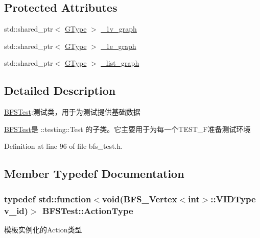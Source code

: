 \subsection*{Protected Attributes}
\begin{DoxyCompactItemize}
\item 
std\+::shared\+\_\+ptr$<$ \hyperlink{class_b_f_s_test_ad38ca5029d5674d467dc71d13f5e5c7c}{G\+Type} $>$ \hyperlink{class_b_f_s_test_a0d7cdb7946902c8d93945a35a222b9d7}{\+\_\+1v\+\_\+graph}
\item 
std\+::shared\+\_\+ptr$<$ \hyperlink{class_b_f_s_test_ad38ca5029d5674d467dc71d13f5e5c7c}{G\+Type} $>$ \hyperlink{class_b_f_s_test_a0158014634e67e6bee3f8f6b1e622ced}{\+\_\+1e\+\_\+graph}
\item 
std\+::shared\+\_\+ptr$<$ \hyperlink{class_b_f_s_test_ad38ca5029d5674d467dc71d13f5e5c7c}{G\+Type} $>$ \hyperlink{class_b_f_s_test_aacf800be44976478c190b2acd338377f}{\+\_\+list\+\_\+graph}
\end{DoxyCompactItemize}


\subsection{Detailed Description}
\hyperlink{class_b_f_s_test}{B\+F\+S\+Test}\+:测试类，用于为测试提供基础数据 

{\ttfamily \hyperlink{class_b_f_s_test}{B\+F\+S\+Test}}是 {\ttfamily \+::testing\+::\+Test} 的子类。它主要用于为每一个{\ttfamily T\+E\+S\+T\+\_\+\+F}准备测试环境 

Definition at line 96 of file bfs\+\_\+test.\+h.



\subsection{Member Typedef Documentation}
\hypertarget{class_b_f_s_test_a4012e860a3e78030ef0f4f544a834177}{}
\subsubsection[{Action\+Type}]{\setlength{\rightskip}{0pt plus 5cm}typedef std\+::function$<$void({\bf B\+F\+S\+\_\+\+Vertex}$<$int$>$\+::V\+I\+D\+Type v\+\_\+id)$>$ {\bf B\+F\+S\+Test\+::\+Action\+Type}}\label{class_b_f_s_test_a4012e860a3e78030ef0f4f544a834177}
模板实例化的\+Action类型 

